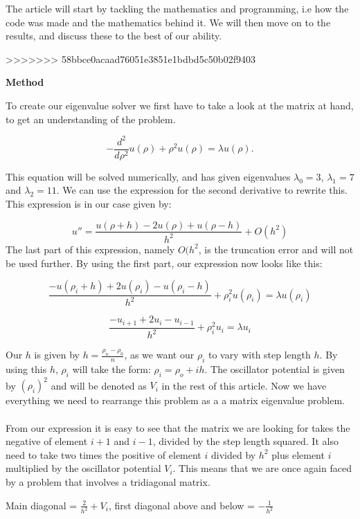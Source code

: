\documentclass[10pt,a4paper]{article}
\begin{document}
\noindent The article will start by tackling the mathematics and programming, i.e how the code was made and the mathematics behind it. We will then move on to the results, and discuss these to the best of our ability.  


>>>>>>> 58bbce0acaad76051e3851e1bdbd5c50b02f9403
\newpage

\begin{center}
{\LARGE\bf Method}
\end{center}
To create our eigenvalue solver we first have to take a look at the matrix at hand, to get an understanding of the problem.

$$
  -\frac{d^2}{d\rho^2} u(\rho) + \rho^2u(\rho)  = \lambda u(\rho) .
$$

\noindent This equation will be solved numerically, and has given eigenvalues $\lambda_0=3$, $\lambda_1=7$ and $\lambda_2=11$. We can use the expression for the second derivative to rewrite this. This expression is in our case given by:

$$
 u''=\frac{u(\rho+h) -2u(\rho) +u(\rho-h)}{h^2} +O(h^2)
$$
\noindent
The last part of this expression, namely $O(h^2$, is the truncation error and will not be used further. By using the first part, our expression now looks like this:

$$
\frac{-u(\rho_i+h) +2u(\rho_i) -u(\rho_i-h)}{h^2}+\rho_i^2u(\rho_i)  = \lambda u(\rho_i)
$$

$$
\frac{-u_{i+1} +2u_i -u_{i-1}}{h^2}+\rho_i^2u_i= \lambda u_i
$$

\noindent Our $h$ is given by $h=\frac{\rho_n - \rho_0}{n}$, as we want our $\rho_i$ to vary with step length $h$. By using this $h$, $\rho_i$ will take the form: $\rho_i = \rho_o + ih$. The oscillator potential is given by $(\rho_i)^2$ and will be denoted as $V_i$ in the rest of this article. Now we have everything we need to rearrange this problem as a a matrix eigenvalue problem. \\
\\
From our expression it is easy to see that the matrix we are looking for takes the negative of element $i+1$ and $i-1$, divided by the step length squared. It also need to take two times the positive of element $i$ divided by $h^2$ plus element $i$ multiplied by the oscillator potential $V_i$. This means that we are once again faced by a problem that involves a tridiagonal matrix.

\begin{center}
Main diagonal = $\frac{2}{h^2} + V_i$, first diagonal above and below = $-\frac{1}{h^2}$
\end{center}
\end{document}
